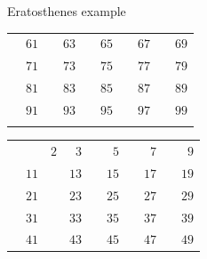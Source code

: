 \documentclass{beamer}
\begin{document}
\begin{frame}[plain]{Eratosthenes example}
{\begin{tabular}{r r r r r r r r r r}
			                   & \color{black} $61$ &                    & \color{black} $63$ &                    & \color{black} $65$ &                    & \color{black} $67$ &                    & \color{black} $69$\\
			                   & \color{black} $71$ &                    & \color{black} $73$ &                    & \color{black} $75$ &                    & \color{black} $77$ &                    & \color{black} $79$\\
			                   & \color{black} $81$ &                    & \color{black} $83$ &                    & \color{black} $85$ &                    & \color{black} $87$ &                    & \color{black} $89$\\
			                   & \color{black} $91$ &                    & \color{black} $93$ &                    & \color{black} $95$ &                    & \color{black} $97$ &                    & \color{black} $99$\\
			\phantom{$888$} & \phantom{$888$} & \phantom{$888$} & \phantom{$888$} & \phantom{$888$} & \phantom{$888$} & \phantom{$888$} & \phantom{$888$} & \phantom{$888$} & \phantom{$888$}
        \end{tabular}
	}
	 {
		\begin{tabular}{r r r r r r r r r r}
			                   &                    & \color{black}  $2$ & \color{ blue}  $3$ &                    & \color{black}  $5$ &                    & \color{black}  $7$ &                    & \color{black}  $9$\\
			                   & \color{black} $11$ &                    & \color{black} $13$ &                    & \color{black} $15$ &                    & \color{black} $17$ &                    & \color{black} $19$\\
			                   & \color{black} $21$ &                    & \color{black} $23$ &                    & \color{black} $25$ &                    & \color{black} $27$ &                    & \color{black} $29$\\
			                   & \color{black} $31$ &                    & \color{black} $33$ &                    & \color{black} $35$ &                    & \color{black} $37$ &                    & \color{black} $39$\\
			                   & \color{black} $41$ &                    & \color{black} $43$ &                    & \color{black} $45$ &                    & \color{black} $47$ &                    & \color{black} $49$\\

\end{tabular}}
\end{frame}
\end{document}
